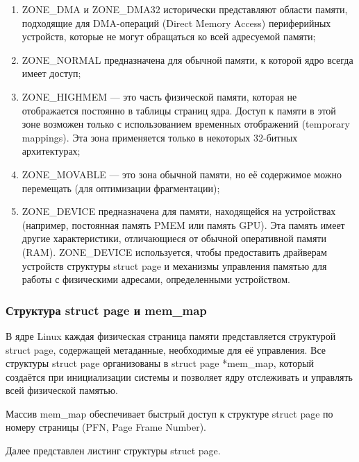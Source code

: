 \begin{enumerate}
    \item ZONE\_DMA и ZONE\_DMA32 исторически представляют области памяти, подходящие для DMA-операций (Direct Memory Access) периферийных устройств, которые не могут обращаться ко всей адресуемой памяти;
    \item ZONE\_NORMAL предназначена для обычной памяти, к которой ядро всегда имеет доступ;
    \item ZONE\_HIGHMEM --- это часть физической памяти, которая не отображается постоянно в таблицы страниц ядра. Доступ к памяти в этой зоне возможен только с использованием временных отображений (temporary mappings). Эта зона применяется только в некоторых 32-битных архитектурах;
    \item ZONE\_MOVABLE --- это зона обычной памяти, но её содержимое можно перемещать (для оптимизации фрагментации);
    \item ZONE\_DEVICE предназначена для памяти, находящейся на устройствах (например, постоянная память PMEM или память GPU). Эта память имеет другие характеристики, отличающиеся от обычной оперативной памяти (RAM). ZONE\_DEVICE используется, чтобы предоставить драйверам устройств структуры {struct page} и механизмы управления памятью для работы с физическими адресами, определенными устройством.~\cite{mem}
\end{enumerate}

\subsubsection{Структура struct page и mem\_map}

В ядре Linux каждая физическая страница памяти представляется структурой {struct page}, содержащей метаданные, необходимые для её управления.
Все структуры {struct page} организованы в {struct page *mem\_map}, который создаётся при инициализации системы и позволяет ядру отслеживать и управлять всей физической памятью.

Массив mem\_map обеспечивает быстрый доступ к структуре {struct page} по номеру страницы (PFN, Page Frame Number).

Далее представлен листинг структуры {struct page}.

